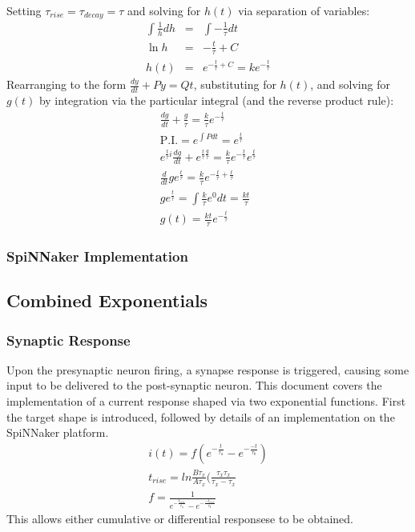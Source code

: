 \documentclass[12pt]{article}
\begin{document}
Setting $\tau_{rise}=\tau_{decay} = \tau$ and solving for $h(t)$ via separation of variables:
\begin{eqnarray}
\int \frac{1}{h} dh & = & \int -\frac{1}{\tau}dt \nonumber \\
\ln{h} & = & -\frac{t}{\tau} + C \nonumber \\
h(t) & = & e^{-\frac{t}{\tau}+C} = ke^{-\frac{t}{\tau}} \nonumber
\label{eqn:solve_for_h}
\end{eqnarray}
Rearranging to the form $\frac{dy}{dt} +Py = Qt$, substituting for $h(t)$, and solving for $g(t)$ by integration via the particular integral (and the reverse product rule):
\begin{eqnarray}
\frac{dg}{dt} + \frac{g}{\tau} =\frac{k}{\tau}e^{-\frac{t}{\tau}} \nonumber \\
\mathrm{P.I.} =  e^{\int P dt} = e^{\frac{t}{\tau}} \nonumber \\
e^{\frac{t}{\tau}i}\frac{dg}{dt} +  e^{\frac{t}{\tau}\frac{g}{\tau}} = \frac{k}{\tau}e^{-\frac{t}{\tau}}e^{\frac{t}{\tau}} \nonumber \\
\frac{d}{dt} g e^{\frac{t}{\tau}} = \frac{k}{\tau}e^{-\frac{t}{\tau} + \frac{t}{\tau}} \nonumber \\
g e^{\frac{t}{\tau}} = \int \frac{k}{\tau}e^0 dt = \frac{kt}{\tau} \nonumber \\
g(t) = \frac{kt}{\tau}e^{-\frac{t}{\tau}}
\end{eqnarray}
\subsubsection*{SpiNNaker Implementation}


\subsection{Combined Exponentials}
\subsubsection*{Synaptic Response}
Upon the presynaptic neuron firing, a synapse response is triggered, causing some input to be delivered to the post-synaptic neuron. This document covers the implementation of a current response shaped via two exponential functions. First the target shape is introduced, followed by details of an implementation on the SpiNNaker platform.
\begin{eqnarray}
i(t) = f(e^{-\frac{t}{\tau_a}} - e^{-\frac{-t}{\tau_b}}) \\
t_{rise} = ln\frac{B\tau_x}{A\tau_x}(\frac{\tau_x\tau_x}{\tau_x - \tau_x} \\
f = \frac{1}{e^{-\frac{t_{rise}}{\tau_a}} - e^{-\frac{-t_{rise}}{\tau_b}}}
\label{eqn:combined_exponential_response}
\end{eqnarray}
This allows either cumulative or differential responsese to be obtained.
\end{document}
